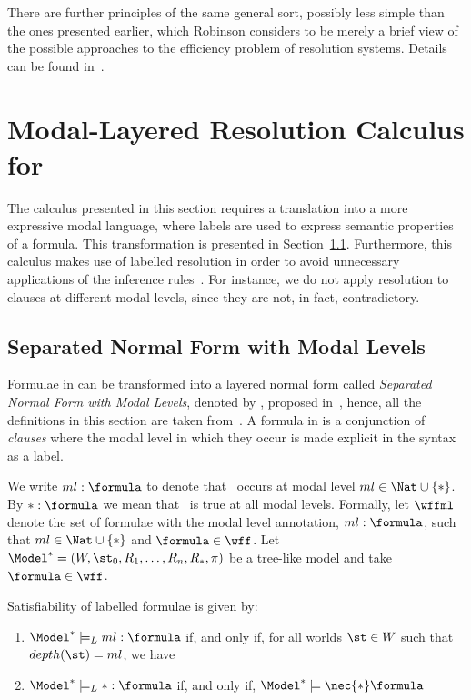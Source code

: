 There are further principles of the same general sort, possibly less simple than
the ones presented earlier, which Robinson considers to be merely a brief view
of the possible approaches to the efficiency problem of resolution systems.
Details can be found in~\cite{Robinson65}.

\section{Modal-Layered Resolution Calculus for }%
\label{sec:calculus}

The calculus presented in this section requires a translation into a more
expressive modal language, where labels are used to express semantic properties
of a formula. This transformation is presented in Section~\ref{sec:snf}.
Furthermore, this calculus makes use of labelled resolution in order to avoid
unnecessary applications of the inference rules~\cite{nalon2015modal}. For
instance, we do not apply resolution to clauses at different modal levels, since
they are not, in fact, contradictory.

\subsection{Separated Normal Form with Modal Levels}%
\label{sec:snf}

Formulae in  can be transformed into a layered normal form called
\emph{Separated Normal Form with Modal Levels}, denoted by , proposed
in~\cite{journals/jal/NalonD07}, hence, all the definitions in this section are
taken from~\cite{journals/jal/NalonD07}. A formula in  is a
conjunction of \emph{clauses} where the modal level in which they occur is made
explicit in the syntax as a label.

We write $ml: \formula$ to denote that \formula~occurs at modal level $ml\in
\Nat \cup \{*\}$. By $*: \formula$ we mean that \formula~is true at
all modal levels. Formally, let $\wffml$ denote the set of formulae with
the modal level annotation, $ml : \formula$, such that $ml \in \Nat \cup \{*\}$
and $\formula \in \wff$. Let $\Model^* = (W, \st_0, R_1, \ldots, R_n, R_*, \pi)$
be a tree-like model and take $\formula \in \wff$. 

\begin{definition}
Satisfiability of labelled formulae is given by:

\begin{enumerate}
    \item $\Model^* \models_L ml : \formula$ if, and only if, for all worlds
        $\st \in W$ such that $depth(\st) = ml$, we have
        \sat{\Model^*}{\st}{\formula} 
    \item $\Model^* \models_L * : \formula$ if, and only if, $\Model^* \models
        \nec{*} \formula$
\end{enumerate}
    
\end{definition}

